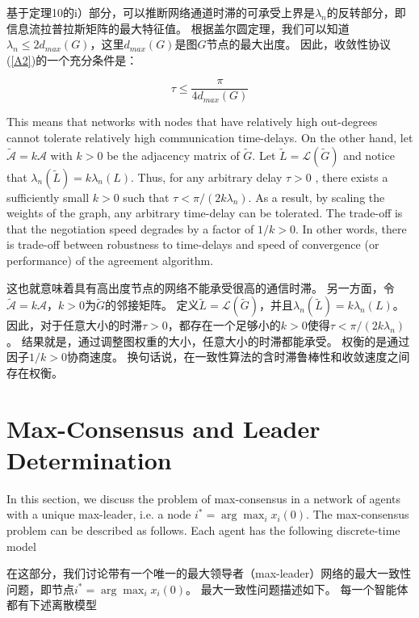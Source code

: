 \documentclass{article}
\begin{document}
基于定理10的i）部分，可以推断网络通道时滞的可承受上界是$\lambda_n$的反转部分，即信息流拉普拉斯矩阵的最大特征值。
根据盖尔圆定理，我们可以知道$\lambda_n\le 2d_{max}(G)$，这里$d_{max}(G)$是图$G$节点的最大出度。
因此，收敛性协议(\ref{A2})的一个充分条件是：

\begin{equation}
    \tau \le \frac{\pi}{4d_{max}(G)}
    \tag{40}
    \label{40}
\end{equation}

{\color[gray]{0.5}
\noindent This means that networks with nodes that have relatively high out-degrees cannot tolerate relatively high communication time-delays. 
On the other hand, let $\tilde{\mathcal{A}}=k\mathcal{A}$ with $k>0$ be the adjacency matrix of $\tilde{G}$. 
Let $\tilde{L}=\mathcal{L}(\tilde{G})$ and notice that $\lambda_n(\tilde{L}) = k\lambda_n(L)$. 
Thus, for any arbitrary delay $\tau>0$ , there exists a sufficiently small $k>0$ such that $\tau < \pi/(2k\lambda_n)$. 
As a result, by scaling the weights of the graph, any arbitrary time-delay can be tolerated. 
The trade-off is that the negotiation speed degrades by a factor of $1/k>0$. 
In other words, there is trade-off between robustness to time-delays and speed of convergence (or performance) of the agreement algorithm. 
}

\noindent 这也就意味着具有高出度节点的网络不能承受很高的通信时滞。
另一方面，令$\tilde{\mathcal{A}}=k\mathcal{A}$，$k>0$为$\tilde{G}$的邻接矩阵。
定义$\tilde{L}=\mathcal{L}(\tilde{G})$，并且$\lambda_n(\tilde{L}) = k\lambda_n(L)$。
因此，对于任意大小的时滞$\tau>0$，都存在一个足够小的$k>0$使得$\tau < \pi/(2k\lambda_n)$。
结果就是，通过调整图权重的大小，任意大小的时滞都能承受。
权衡的是通过因子$1/k>0$协商速度。
换句话说，在一致性算法的含时滞鲁棒性和收敛速度之间存在权衡。

\section{Max-Consensus and Leader Determination}
{\color[gray]{0.5}
\noindent In this section, we discuss the problem of max-consensus in a network of agents with a unique max-leader, i.e. a node $i^*=\arg\max_ix_i(0)$. 
The max-consensus problem can be described as follows. 
Each agent has the following discrete-time model
}

\noindent 在这部分，我们讨论带有一个唯一的最大领导者（max-leader）网络的最大一致性问题，即节点$i^*=\arg\max_ix_i(0)$。
最大一致性问题描述如下。
每一个智能体都有下述离散模型
\end{document}
